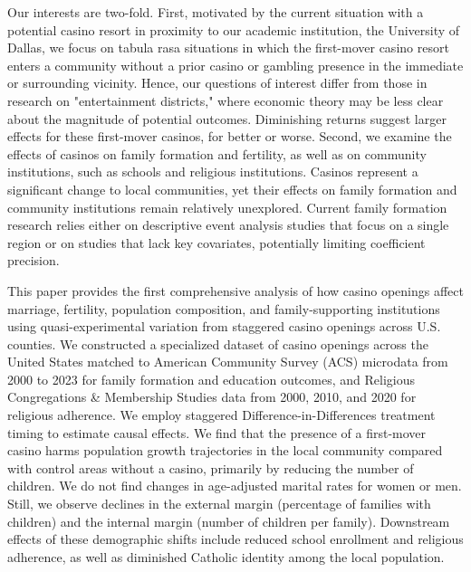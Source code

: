 \documentclass[12pt]{article}
\begin{document}
Our interests are two-fold. First, motivated by the current situation with a potential casino resort in proximity to our academic institution, the University of Dallas, we focus on tabula rasa situations in which the first-mover casino resort enters a community without a prior casino or gambling presence in the immediate or surrounding vicinity. Hence, our questions of interest differ from those in research on "entertainment districts," where economic theory may be less clear about the magnitude of potential outcomes. Diminishing returns suggest larger effects for these first-mover casinos, for better or worse. Second, we examine the effects of casinos on family formation and fertility, as well as on community institutions, such as schools and religious institutions. Casinos represent a significant change to local communities, yet their effects on family formation and community institutions remain relatively unexplored. Current family formation research relies either on descriptive event analysis studies that focus on a single region or on studies that lack key covariates, potentially limiting coefficient precision. \parencite{moellman2013indian}  



This paper provides the first comprehensive analysis of how casino openings affect marriage, fertility, population composition, and family-supporting institutions using quasi-experimental variation from staggered casino openings across U.S. counties. We constructed a specialized dataset of casino openings across the United States matched to American Community Survey (ACS) microdata from 2000 to 2023 for family formation and education outcomes, and Religious Congregations \& Membership Studies data from 2000, 2010, and 2020 for religious adherence. We employ staggered Difference-in-Differences treatment timing to estimate causal effects. We find that the presence of a first-mover casino harms population growth trajectories in the local community compared with control areas without a casino, primarily by reducing the number of children. We do not find changes in age-adjusted marital rates for women or men. Still, we observe declines in the external margin (percentage of families with children) and the internal margin (number of children per family). Downstream effects of these demographic shifts include reduced school enrollment and religious adherence, as well as diminished Catholic identity among the local population.


\end{document}
